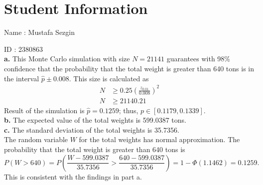 \documentclass[12pt]{article}
\begin{document}
\section*{Student Information}

Name : Mustafa Sezgin

ID : 2380863 \\


\textbf{a.} This Monte Carlo simulation with size $N = 21141$ guarantees with 98\% confidence that the probability that the total weight is greater than 640 tons is in the interval $\hat{p} \pm 0.008$. This size is calculated as
\begin{align*}
    N &\ge 0.25 \left( \frac{z_{0.01}}{0.008} \right)^2 \\
    N &\ge 21140.21
\end{align*}
Result of the simulation is $\hat{p} = 0.1259$; thus, $p \in [0.1179, 0.1339]$. \\

\textbf{b.} The expected value of the total weights is 599.0387 tons. \\ %

\textbf{c.} The standard deviation of the total weights is 35.7356. \\

The random variable $W$ for the total weights has normal approximation. The probability that the total weight is greater than 640 tons is
\[
    P(W > 640) = P\left( \frac{W - 599.0387}{35.7356} > \frac{640 - 599.0387}{35.7356} \right) = 1 - \Phi(1.1462) = 0.1259.
\]
This is consistent with the findings in part a.

\end{document}
